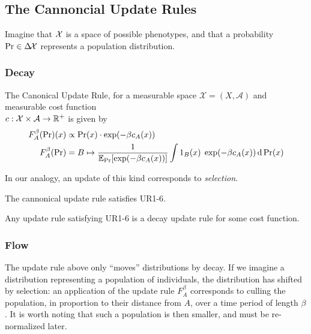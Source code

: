\documentclass{article}
\begin{document}
\subsection{The Cannoncial Update Rules}
Imagine that $\mathcal X$ is a space of possible phenotypes, and that a probability $\Pr \in \Delta\!\mathcal X$ represents a population distribution. 

\subsubsection{Decay}
The Canonical Update Rule, for a measurable space $\mathcal X = (X, \mathcal A)$ and measurable cost function\\
$c: \mathcal X\times\mathcal A \to \mathbb R^+$ is given by
\def\cost#1#2{c_{#2}(#1)}
\begin{align*}
    F^\beta_A(\Pr)(x) &\propto \Pr(x) \cdot \exp(-\beta \cost xA) \\
    F^\beta_A(\Pr) &= B \mapsto \frac{1}{\Ex_{\Pr}[\exp(-\beta \cost xA )]}
        \int 1_B(x) \; \exp(-\beta \cost xA ) \,\mathrm d\Pr(x)
\end{align*}

In our analogy, an update of this kind corresponds to \emph{selection}.

\begin{prop}
    The cannonical update rule satisfies UR1-6.
\end{prop}


\begin{conj}
    Any update rule satisfying UR1-6 is a decay update rule for some cost function.
\end{conj}


\subsubsection{Flow}
\def\vgrad{\boldsymbol\nabla}
The update rule above only ``moves'' distributions by decay. If we imagine a distribution representing a population of individuals, the distribution has shifted by selection: an application of the update rule $F_A^\beta$ corresponds to culling the population, in proportion to their distance from $A$, over a time period of length $\beta$.
It is worth noting that such a population is then smaller, and must be re-normalized later.
\end{document}
